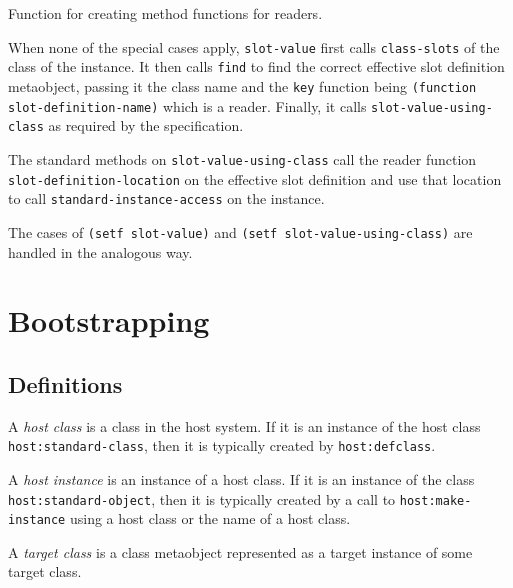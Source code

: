 \begin{codefragment}
\caption{\label{code-make-reader}
Function for creating method functions for readers.}
\end{codefragment}

When none of the special cases apply, \texttt{slot-value} first calls
\texttt{class-slots} of the class of the instance.  It then calls
\texttt{find} to find the correct effective slot definition
metaobject, passing it the class name and the \texttt{key} function
being \texttt{(function slot-definition-name)} which is a reader.
Finally, it calls \texttt{slot-value-using-class} as required by the
specification.

The standard methods on \texttt{slot-value-using-class} call the
reader function \texttt{slot-definition-location} on the effective
slot definition and use that location to call
\texttt{standard-instance-access} on the instance.

The cases of \texttt{(setf slot-value)} and \texttt{(setf
  slot-value-using-class)} are handled in the analogous way.

\section{Bootstrapping}

\subsection{Definitions}

\begin{definition}
A \emph{host class} is a class in the host system.  If it is an
instance of the host class \texttt{host:standard-class}, then it is
typically created by \texttt{host:defclass}.
\end{definition}

\begin{definition}
A \emph{host instance} is an instance of a host class.  If it is an
instance of the class \texttt{host:standard-object}, then it is
typically created by a call to \texttt{host:make-instance} using a
host class or the name of a host class.
\end{definition}

\begin{definition}
A \emph{target class} is a class metaobject represented as a target
instance of some target class. 
\end{definition}

